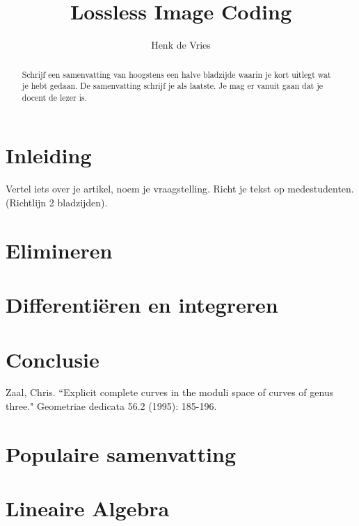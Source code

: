 \documentclass[dubaWI]{uvamath}%
\title{Lossless Image Coding}
\author[henk@science.uva.nl, 6127901]{Henk de Vries}
\begin{document}
\maketitle

\begin{abstract}
Schrijf een samenvatting van hoogstens een halve bladzijde waarin je kort uitlegt wat je hebt gedaan. De samenvatting schrijf je als laatste. Je mag er vanuit gaan dat je docent de lezer is.
\end{abstract}

\tableofcontents

\chapter{Inleiding}
Vertel iets over je artikel, noem je vraagstelling. Richt je tekst op medestudenten. (Richtlijn 2 bladzijden).

\chapter{Elimineren}
\lipsum[1-3]

\chapter{Differenti\"eren en integreren}
\lipsum[1-3]

\chapter{Conclusie}

\clearpage%
\begin{thebibliography}{}
Zaal, Chris. ``Explicit complete curves in the moduli space of curves of genus three." Geometriae dedicata 56.2 (1995): 185-196.
\end{thebibliography}

\lipsum[1-3]

\clearpage%
\chapter*{Populaire samenvatting}
\lipsum[1-2]

\appendix

\chapter{Lineaire Algebra}
\lipsum[1-3]
\end{document}
